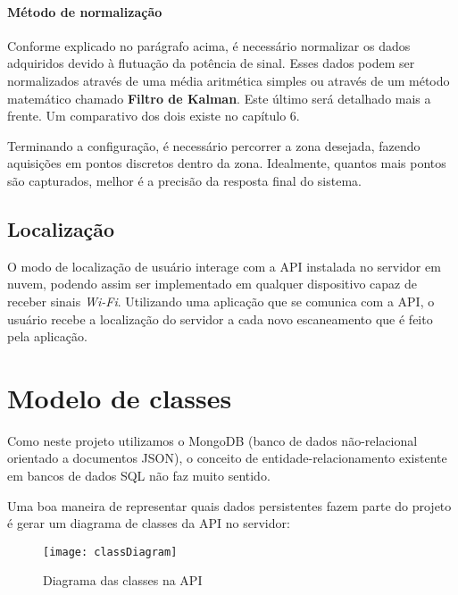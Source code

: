 \paragraph{Método de normalização\\}
Conforme explicado no parágrafo acima, é necessário normalizar os dados adquiridos devido à flutuação da potência de sinal. Esses dados podem ser normalizados através de uma média aritmética simples ou através de um método matemático chamado \textbf{Filtro de Kalman}. Este último será detalhado mais a frente. Um comparativo dos dois existe no capítulo 6.
\par

Terminando a configuração, é necessário percorrer a zona desejada, fazendo aquisições em pontos discretos dentro da zona. Idealmente, quantos mais pontos são capturados, melhor é a precisão da resposta final do sistema.

\subsection{Localização}
O modo de localização de usuário interage com a API instalada no servidor em nuvem, podendo assim ser implementado em qualquer dispositivo capaz de receber sinais \textit{Wi-Fi}. Utilizando uma aplicação que se comunica com a API, o usuário recebe a localização do servidor a cada novo escaneamento que é feito pela aplicação.

\section{Modelo de classes}
Como neste projeto utilizamos o MongoDB (banco de dados não-relacional orientado a documentos JSON), o conceito de entidade-relacionamento existente em bancos de dados SQL não faz muito sentido.
\par
Uma boa maneira de representar quais dados persistentes fazem parte do projeto é gerar um diagrama de classes da API no servidor:
\begin{figure}[H]
	\centering
	\caption{Diagrama das classes na API}
  \texttt{[image: classDiagram]}
\label{fig:diagramaClasse}
\end{figure}


